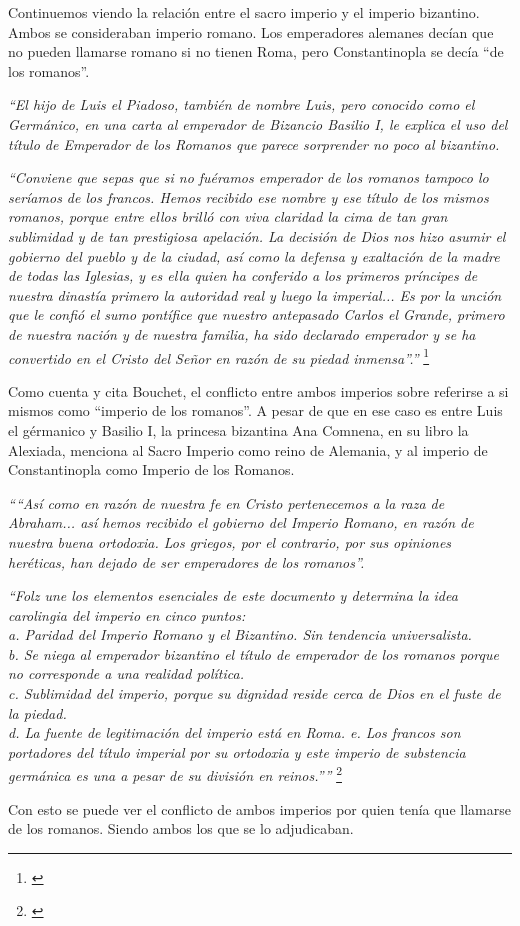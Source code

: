 Continuemos viendo la relación entre el sacro imperio y
el imperio bizantino. Ambos se consideraban imperio romano.
Los emperadores alemanes decían que no pueden llamarse romano
si no tienen Roma, pero Constantinopla se decía ``de los
romanos''.

\textit{``El hijo de Luis el Piadoso, también de nombre Luis,
	pero conocido como el Germánico, en una carta al
	emperador de Bizancio Basilio I, le explica el uso del
	título de Emperador de los Romanos que parece sorprender
	no poco al bizantino.}

\textit{``Conviene que sepas que si no fuéramos emperador de los
	romanos tampoco lo seríamos de los francos. Hemos recibido
	ese nombre y ese título de los mismos romanos, porque
	entre ellos brilló con viva claridad la cima de tan gran
	sublimidad y de tan prestigiosa apelación.
	La decisión de Dios nos hizo asumir el gobierno del pueblo
	y de la ciudad, así como la defensa y exaltación de la madre
	de todas las Iglesias, y es ella quien ha conferido a los
	primeros príncipes de nuestra dinastía primero la autoridad
	real y luego la imperial...
	Es por la unción que le confió el sumo pontífice que
	nuestro antepasado Carlos el Grande, primero de nuestra
	nación y de nuestra familia, ha sido declarado emperador
	y se ha convertido en el Cristo del Señor en razón
	de su piedad inmensa''.''}
\footnote{\cite[p.~846]{ciudad}}

Como cuenta y cita Bouchet, el conflicto entre ambos imperios
sobre referirse a si mismos como ``imperio de los romanos''.
A pesar de que en ese caso es entre Luis el gérmanico y
Basilio I, la princesa bizantina Ana Comnena, en su libro
la Alexiada, menciona al Sacro Imperio como reino de Alemania,
y al imperio de Constantinopla como Imperio de los Romanos.

\textit{
	````Así como en razón de nuestra fe en Cristo pertenecemos
	a la raza de Abraham... así hemos recibido el gobierno del
	Imperio Romano, en razón de nuestra buena ortodoxia.
	Los griegos, por el contrario, por sus opiniones heréticas,
	han dejado de ser emperadores de los romanos''.}

\textit{
	``Folz une los elementos esenciales de este documento
	y determina la idea carolingia del imperio
	en cinco puntos:\\
	a. Paridad del Imperio Romano y el Bizantino. Sin
	tendencia universalista.\\
	b. Se niega al emperador bizantino el título de emperador
	de los romanos porque no corresponde a una realidad política.\\
	c. Sublimidad del imperio, porque su dignidad reside cerca de
	Dios en el fuste de la piedad.\\
	d. La fuente de legitimación del imperio está en Roma.
	e. Los francos son portadores del título imperial por su
	ortodoxia y este imperio de substencia germánica es una a
	pesar de su división en reinos.''''}
\footnote{\cite[p.~846-847]{ciudad}}

Con esto se puede ver el conflicto de ambos imperios por
quien tenía que llamarse de los romanos. Siendo ambos los
que se lo adjudicaban.


















